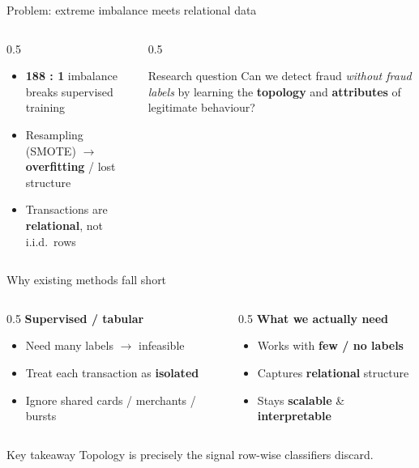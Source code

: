 \documentclass[10pt,aspectratio=169]{beamer}
\newcommand{\hl}[1]{\textcolor{mBlue}{\textbf{#1}}}    %
\newcommand{\bl}[1]{\textcolor{mDark}{\textbf{#1}}}    %
\newcommand{\gr}[1]{\textcolor{mGreen}{\textbf{#1}}}   %
\newcommand{\rd}[1]{\textcolor{mRed}{\textbf{#1}}}     %
\newenvironment{takeaway}{\begin{exampleblock}{Key takeaway}}{\end{exampleblock}}
\begin{document}
\begin{frame}{Problem: extreme imbalance meets relational data}
  \begin{columns}[T]
    \begin{column}{0.5\textwidth}
      \begin{itemize}
        \item \rd{188 : 1} imbalance breaks supervised training
        \item Resampling (SMOTE) $\rightarrow$ \hl{overfitting} / lost structure
        \item Transactions are \bl{relational}, not i.i.d.\ rows
      \end{itemize}
    \end{column}
    \begin{column}{0.5\textwidth}
      \begin{block}{Research question}
        Can we detect fraud \emph{without fraud labels} by learning the \hl{topology} and \hl{attributes} of legitimate behaviour?
      \end{block}
    \end{column}
  \end{columns}
\end{frame}

\begin{frame}{Why existing methods fall short}
  \begin{columns}[T]
    \begin{column}{0.5\textwidth}
      \textbf{Supervised / tabular}
      \begin{itemize}
        \item Need many labels $\rightarrow$ infeasible
        \item Treat each transaction as \rd{isolated}
        \item Ignore shared cards / merchants / bursts
      \end{itemize}
    \end{column}
    \begin{column}{0.5\textwidth}
      \textbf{What we actually need}
      \begin{itemize}
        \item Works with \gr{few / no labels}
        \item Captures \gr{relational} structure
        \item Stays \gr{scalable} \& \gr{interpretable}
      \end{itemize}
    \end{column}
  \end{columns}
  \vspace{0.3em}
  \begin{takeaway}
    Topology is precisely the signal row-wise classifiers discard.
  \end{takeaway}
\end{frame}
\end{document}
